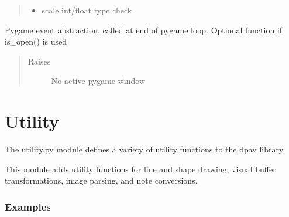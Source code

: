 \documentclass[letterpaper,10pt,english,openany,oneside]{sphinxmanual}
\begin{document}
\begin{fulllineitems}
\begin{fulllineitems}
\begin{quote}
\begin{description}
\begin{itemize}
\item {} 
\sphinxAtStartPar
{} \textendash{} scale int/float type check

\end{itemize}

\end{description}\end{quote}

\end{fulllineitems}


\begin{fulllineitems}
\label{\detokenize{dpav:dpav.window.Window.update}}
\sphinxAtStartPar
Pygame event abstraction, called at end of pygame loop.
Optional function if is\_open() is used
\begin{quote}\begin{description}
\item[{Raises}] \leavevmode
\sphinxAtStartPar
{} \textendash{} No active pygame window

\end{description}\end{quote}

\end{fulllineitems}


\end{fulllineitems}



\section{Utility}
\label{\detokenize{dpav:module-dpav.utility}}\label{\detokenize{dpav:utility}}
\sphinxAtStartPar
The utility.py module defines a variety of utility functions to the dpav library.

\sphinxAtStartPar
This module adds utility functions for line and shape drawing, visual buffer
transformations, image parsing, and note conversions.
\subsubsection*{Examples}
\end{document}
